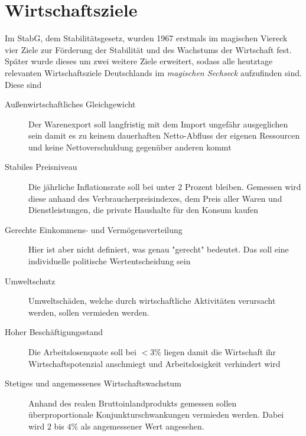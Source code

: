 \documentclass{article}
\begin{document}
 
 
\section{Wirtschaftsziele}
Im StabG, dem Stabilitätsgesetz, wurden 1967 erstmals im magischen Viereck vier Ziele zur Förderung der Stabilität und des Wachstums der Wirtschaft fest. Später wurde dieses um zwei weitere Ziele erweitert, sodass alle heutztage relevanten Wirtschaftsziele Deutschlands im \emph{magischen Sechseck} aufzufinden sind. Diese sind
\begin{description}
 \item[Außenwirtschaftliches Gleichgewicht] Der Warenexport soll langfristig mit dem Import ungefähr ausgeglichen sein damit es zu keinem dauerhaften Netto-Abfluss der eigenen Ressourcen und keine Nettoverschuldung gegenüber anderen kommt
 \item[Stabiles Preisniveau] Die jährliche Inflationsrate soll bei unter 2 Prozent bleiben. Gemessen wird diese anhand des Verbraucherpreisindexes, dem Preis aller Waren und Dienstleistungen, die private Haushalte für den Konsum kaufen
 \item[Gerechte Einkommens- und Vermögensverteilung] Hier ist aber nicht definiert, was genau "gerecht" bedeutet. Das soll eine individuelle politische Wertentscheidung sein
 \item[Umweltschutz] Umweltschäden, welche durch wirtschaftliche Aktivitäten verursacht werden, sollen vermieden werden.
 \item[Hoher Beschäftigungsstand] Die Arbeitslosenquote soll bei $<3\%$ liegen damit die Wirtschaft ihr Wirtschaftspotenzial anschmiegt und Arbeitslosigkeit verhindert wird
 \item[Stetiges und angemessenes Wirtschaftswachstum] Anhand des realen Bruttoinlandprodukts gemessen sollen überproportionale Konjunkturschwankungen vermieden werden. Dabei wird $2$ bis $4\%$ als angemessener Wert angesehen.  
\end{description}
 
\end{document}
